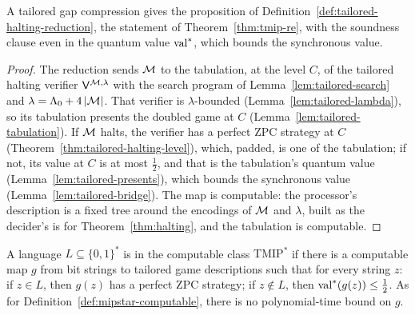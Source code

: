 \begin{theorem}
\label{thm:tailored-halting}
\leanok
A tailored gap compression gives the proposition of
Definition~\ref{def:tailored-halting-reduction}, the statement of Theorem~\ref{thm:tmip-re},
with the soundness clause even in the quantum value $\mathrm{val}^*$, which bounds the synchronous
value.
\end{theorem}

\begin{proof}
\leanok
The reduction sends $\mathcal{M}$ to the tabulation, at the level $C$, of the tailored halting
verifier $\mathsf{V}^{\mathcal{M},\lambda}$ with the search program of
Lemma~\ref{lem:tailored-search} and $\lambda = \Lambda_0 + 4\left\vert {\mathcal{M}} \right\vert$. That verifier is
$\lambda$-bounded (Lemma~\ref{lem:tailored-lambda}), so its tabulation presents the doubled game
at $C$ (Lemma~\ref{lem:tailored-tabulation}). If $\mathcal{M}$ halts, the verifier has a perfect ZPC
strategy at $C$ (Theorem~\ref{thm:tailored-halting-level}), which, padded, is one of the
tabulation; if not, its value at $C$ is at most $\frac12$, and that is the tabulation's quantum
value (Lemma~\ref{lem:tailored-presents}), which bounds the synchronous value
(Lemma~\ref{lem:tailored-bridge}). The map is computable: the processor's description is a fixed
tree around the encodings of $\mathcal{M}$ and $\lambda$, built as the decider's is for
Theorem~\ref{thm:halting}, and the tabulation is computable.
\end{proof}

\begin{definition}
\label{def:tmipstar}
\leanok
A language $L \subseteq \{0,1\}^*$ is in the computable class $\mathrm{TMIP}^*$ if there is a
computable map $g$ from bit strings to tailored game descriptions such that for every string
$z$: if $z \in L$, then $g(z)$ has a perfect ZPC strategy; if $z \notin L$, then
$\mathrm{val}^*(g(z)) \leq \frac12$. As for Definition~\ref{def:mipstar-computable}, there is no
polynomial-time bound on $g$.
\end{definition}


